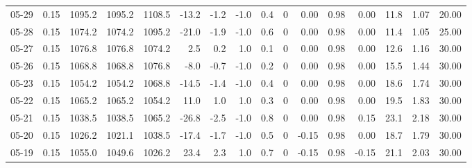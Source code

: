 \begin{threeparttable}
{\begin{tabular}{lrrrrrrrrrrrrrrr}
  05-29 &     0.15 & 1095.2 & 1095.2 & 1108.5 &      -13.2 &           -1.2 &                     -1.0 &                 0.4 &              0 &       0.00 &      0.98 &           0.00 &             11.8 &            1.07 &                  20.00 \\
  05-28 &     0.15 & 1074.2 & 1074.2 & 1095.2 &      -21.0 &           -1.9 &                     -1.0 &                 0.6 &              0 &       0.00 &      0.98 &           0.00 &             11.4 &            1.05 &                  25.00 \\
  05-27 &     0.15 & 1076.8 & 1076.8 & 1074.2 &        2.5 &            0.2 &                      1.0 &                 0.1 &              0 &       0.00 &      0.98 &           0.00 &             12.6 &            1.16 &                  30.00 \\
  05-26 &     0.15 & 1068.8 & 1068.8 & 1076.8 &       -8.0 &           -0.7 &                     -1.0 &                 0.2 &              0 &       0.00 &      0.98 &           0.00 &             15.5 &            1.44 &                  30.00 \\
  05-23 &     0.15 & 1054.2 & 1054.2 & 1068.8 &      -14.5 &           -1.4 &                     -1.0 &                 0.4 &              0 &       0.00 &      0.98 &           0.00 &             18.6 &            1.74 &                  30.00 \\
  05-22 &     0.15 & 1065.2 & 1065.2 & 1054.2 &       11.0 &            1.0 &                      1.0 &                 0.3 &              0 &       0.00 &      0.98 &           0.00 &             19.5 &            1.83 &                  30.00 \\
  05-21 &     0.15 & 1038.5 & 1038.5 & 1065.2 &      -26.8 &           -2.5 &                     -1.0 &                 0.8 &              0 &       0.00 &      0.98 &           0.15 &             23.1 &            2.18 &                  30.00 \\
  05-20 &     0.15 & 1026.2 & 1021.1 & 1038.5 &      -17.4 &           -1.7 &                     -1.0 &                 0.5 &              0 &      -0.15 &      0.98 &           0.00 &             18.7 &            1.79 &                  30.00 \\
  05-19 &     0.15 & 1055.0 & 1049.6 & 1026.2 &       23.4 &            2.3 &                      1.0 &                 0.7 &              0 &      -0.15 &      0.98 &          -0.15 &             21.1 &            2.03 &                  30.00 \\

\end{tabular}}
\end{threeparttable}
